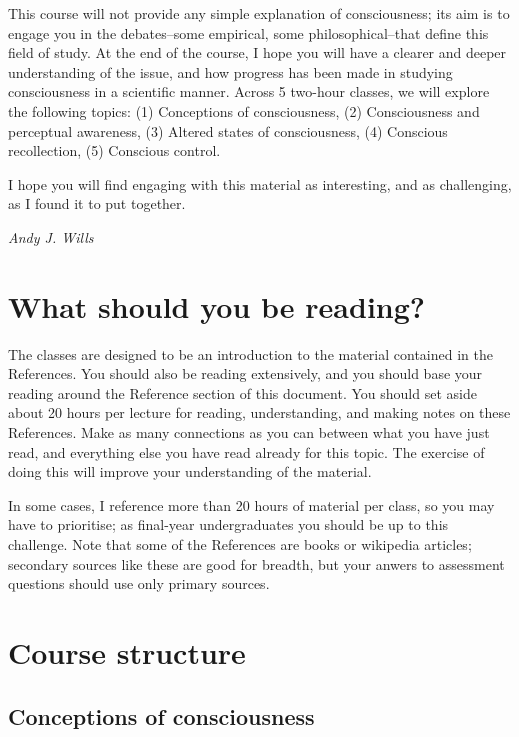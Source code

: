 \documentclass[11pt]{article}
\begin{document}
This course will not provide any simple explanation of consciousness;
its aim is to engage you in the debates--some empirical, some
philosophical--that define this field of study. At the end of the
course, I hope you will have a clearer and deeper understanding of the
issue, and how progress has been made in studying consciousness in a
scientific manner. Across 5 two-hour classes, we will explore the
following topics: (1) Conceptions of consciousness, (2) Consciousness
and perceptual awareness, (3) Altered states of consciousness, (4)
Conscious recollection, (5) Conscious control.

I hope you will find engaging with this material as interesting, and
as challenging, as I found it to put together.

\begin{flushright}
	\emph{Andy J. Wills}
\end{flushright}

\section{What should you be reading?}

The classes are designed to be an introduction to the material
contained in the References. You should also be reading extensively,
and you should base your reading around the Reference section of this
document. You should set aside about 20 hours per lecture for reading,
understanding, and making notes on these References. Make as many
connections as you can between what you have just read, and everything
else you have read already for this topic. The exercise of doing this
will improve your understanding of the
material. 

In some cases, I reference more than 20 hours of material per class,
so you may have to prioritise; as final-year undergraduates you should
be up to this challenge. Note that some of the References are books or
wikipedia articles; secondary sources like these are good for breadth,
but your anwers to assessment questions should use only primary
sources.


\section{Course structure}

\subsection{Conceptions of consciousness}
\end{document}
